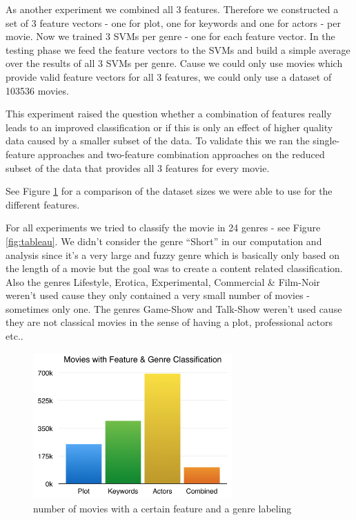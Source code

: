 \documentclass{vldb}
\begin{document}
\par As another experiment we combined all 3 features. Therefore we constructed a set of 3 feature vectors - one for plot, one for keywords and one for actors - per movie. Now we trained 3 SVMs per genre - one for each feature vector. In the testing phase we feed the feature vectors to the SVMs and build a simple average over the results of all 3 SVMs per genre. Cause we could only use movies which provide valid feature vectors for all 3 features, we could only use a dataset of 103536 movies.

\par This experiment raised the question whether a combination of features really leads to an improved classification or if this is only an effect of higher quality data caused by a smaller subset of the data. To validate this we ran the single-feature approaches and two-feature combination approaches on the reduced subset of the data that provides all 3 features for every movie.

\par See Figure \ref{fig:FeaturesAndGenresBarChart} for a comparison of the dataset sizes we were able to use for the different features.

\par For all experiments we tried to classify the movie in 24 genres - see Figure \ref{fig:tableau}. We didn't consider the genre “Short” in our computation and analysis since it's a very large and fuzzy genre which is basically only based on the length of a movie but the goal was to create a content related classification. Also the genres Lifestyle, Erotica, Experimental, Commercial \& Film-Noir weren't used cause they only contained a very small number of movies - sometimes only one. The genres Game-Show and Talk-Show weren't used cause they are not classical movies in the sense of having a plot, professional actors etc..


\begin{figure}
\begin{center}
\includegraphics[width=3.00in]{FeaturesAndGenresBarChart.png}
\caption{number of movies with a certain feature and a genre labeling}
\label{fig:FeaturesAndGenresBarChart}
\end{center}
\end{figure}
\end{document}

